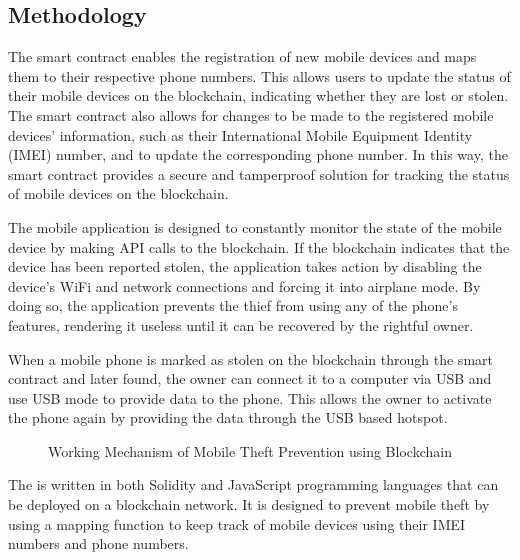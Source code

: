 \documentclass[letterpaper,10pt,english]{jupyterBook}
\let\sphinxpxdimen\pdfpxdimen\else\newdimen\sphinxpxdimen
\begin{document}
\subsection{Methodology}
\label{\detokenize{MTP/mtp:methodology}}
\sphinxAtStartPar
The smart contract enables the registration of new mobile devices and maps them to their respective phone numbers. This allows users to update the status of their mobile devices on the blockchain, indicating whether they are lost or stolen. The smart contract also allows for changes to be made to the registered mobile devices’ information, such as their International Mobile Equipment Identity (IMEI) number, and to update the corresponding phone number. In this way, the smart contract provides a secure and tamper\sphinxhyphen{}proof solution for tracking the status of mobile devices on the blockchain.

\sphinxAtStartPar
The mobile application is designed to constantly monitor the state of the mobile device by making API calls to the blockchain. If the blockchain indicates that the device has been reported stolen, the application takes action by disabling the device’s Wi\sphinxhyphen{}Fi and network connections and forcing it into airplane mode. By doing so, the application prevents the thief from using any of the phone’s features, rendering it useless until it can be recovered by the rightful owner.

\sphinxAtStartPar
When a mobile phone is marked as stolen on the blockchain through the smart contract and later found, the owner can connect it to a computer via USB and use USB mode to provide data to the phone. This allows the owner to activate the phone again by providing the data through the USB based hotspot.

\begin{figure}[htbp]
\centering
\capstart

\noindent\sphinxincludegraphics[width=500\sphinxpxdimen,height=281\sphinxpxdimen]{{mtp}.png}
\caption{Working Mechanism of Mobile Theft Prevention using Blockchain}\label{\detokenize{MTP/mtp:mtp}}\end{figure}

\sphinxAtStartPar
The  is written in both Solidity and JavaScript programming languages that can be deployed on a blockchain network. It is designed to prevent mobile theft by using a mapping function to keep track of mobile devices using their IMEI numbers and phone numbers.
\end{document}

